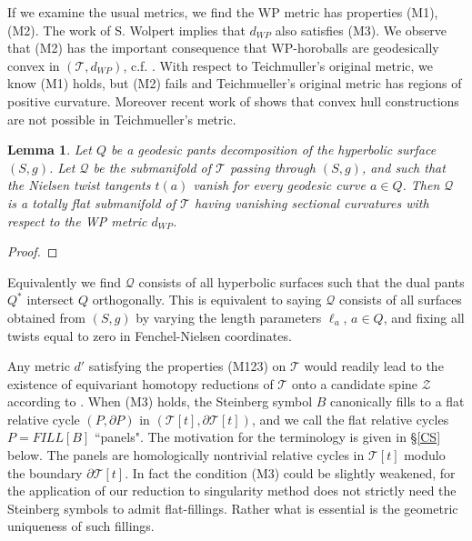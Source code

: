 \documentclass[12pt]{amsart}
\newtheorem{lem}[thm]{Lemma}
\theoremstyle{definition}
\theoremstyle{remark}
\newcommand{\del}{\partial}
\newcommand{\sT}{\mathscr{T}}
\newcommand{\sZ}{\mathscr{Z}}
\begin{document}
If we examine the usual metrics, we find the WP metric has properties (M1), (M2). The work of S. Wolpert implies that $d_{WP}$ also satisfies (M3). We observe that (M2) has the important consequence that WP-horoballs are geodesically convex in $(\sT, d_{WP})$, c.f. \cite{GroCurv}. With respect to Teichmuller's original metric, we know (M1) holds, but (M2) fails and Teichmueller's original metric has regions of positive curvature. Moreover recent work of \cite{RafiBourque} shows that convex hull constructions are not possible in Teichmueller's metric. 



\begin{lem}
Let $Q$ be a geodesic pants decomposition of the hyperbolic surface $(S,g)$. Let $\mathscr{Q}$ be the submanifold of $\sT$ passing through $(S,g)$, and such that the Nielsen twist tangents $t(a)$ vanish for every geodesic curve $a \in Q$. Then $\mathscr{Q}$ is a totally flat submanifold of $\sT$ having vanishing sectional curvatures with respect to the WP metric $d_{WP}$. 
\end{lem}
\begin{proof}

\end{proof}


Equivalently we find $\mathscr{Q}$ consists of all hyperbolic surfaces such that the dual pants $Q^*$ intersect $Q$ orthogonally. This is equivalent to saying $\mathscr{Q}$ consists of all surfaces obtained from $(S,g)$ by varying the length parameters $\ell_a$, $a\in Q$, and fixing all twists equal to zero in Fenchel-Nielsen coordinates. 


Any metric $d'$ satisfying the properties (M123) on $\sT$ would readily lead to the existence of equivariant homotopy reductions of $\sT$ onto a candidate spine $\sZ$ according to \cite{martel}. When (M3) holds, the Steinberg symbol $B$ canonically fills to a flat relative cycle $(P, \del P)$ in $(\sT[t], \del \sT[t])$, and we call the flat relative cycles $P=FILL[B]$ ``panels". The motivation for the terminology is given in \S \eqref{CS} below. The panels are homologically nontrivial relative cycles in $\sT[t]$ modulo the boundary $\del \sT[t]$. In fact the condition (M3) could be slightly weakened, for the application of our reduction to singularity method \cite{martel} does not strictly need the Steinberg symbols to admit flat-fillings. Rather what is essential is the geometric uniqueness of such fillings. 
\end{document}
